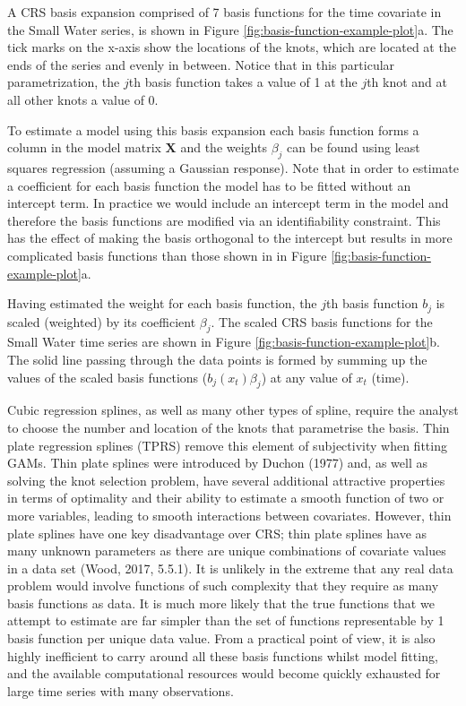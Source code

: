 \documentclass[12pt,]{article}
\begin{document}
A CRS basis expansion comprised of 7 basis functions for the time
covariate in the Small Water series, is shown in Figure
\ref{fig:basis-function-example-plot}a. The tick marks on the x-axis
show the locations of the knots, which are located at the ends of the
series and evenly in between. Notice that in this particular
parametrization, the \(j\)th basis function takes a value of 1 at the
\(j\)th knot and at all other knots a value of 0.

To estimate a model using this basis expansion each basis function forms
a column in the model matrix \(\boldsymbol{X}\) and the weights
\(\beta_j\) can be found using least squares regression (assuming a
Gaussian response). Note that in order to estimate a coefficient for
each basis function the model has to be fitted without an intercept
term. In practice we would include an intercept term in the model and
therefore the basis functions are modified via an identifiability
constraint. This has the effect of making the basis orthogonal to the
intercept but results in more complicated basis functions than those
shown in in Figure \ref{fig:basis-function-example-plot}a.

Having estimated the weight for each basis function, the \(j\)th basis
function \(b_j\) is scaled (weighted) by its coefficient \(\beta_j\).
The scaled CRS basis functions for the Small Water time series are shown
in Figure \ref{fig:basis-function-example-plot}b. The solid line passing
through the data points is formed by summing up the values of the scaled
basis functions (\(b_j(x_t) \beta_j\)) at any value of \(x_t\) (time).

Cubic regression splines, as well as many other types of spline, require
the analyst to choose the number and location of the knots that
parametrise the basis. Thin plate regression splines (TPRS) remove this
element of subjectivity when fitting GAMs. Thin plate splines were
introduced by Duchon (1977) and, as well as solving the knot selection
problem, have several additional attractive properties in terms of
optimality and their ability to estimate a smooth function of two or
more variables, leading to smooth interactions between covariates.
However, thin plate splines have one key disadvantage over CRS; thin
plate splines have as many unknown parameters as there are unique
combinations of covariate values in a data set (Wood, 2017, 5.5.1). It
is unlikely in the extreme that any real data problem would involve
functions of such complexity that they require as many basis functions
as data. It is much more likely that the true functions that we attempt
to estimate are far simpler than the set of functions representable by 1
basis function per unique data value. From a practical point of view, it
is also highly inefficient to carry around all these basis functions
whilst model fitting, and the available computational resources would
become quickly exhausted for large time series with many observations.
\end{document}
